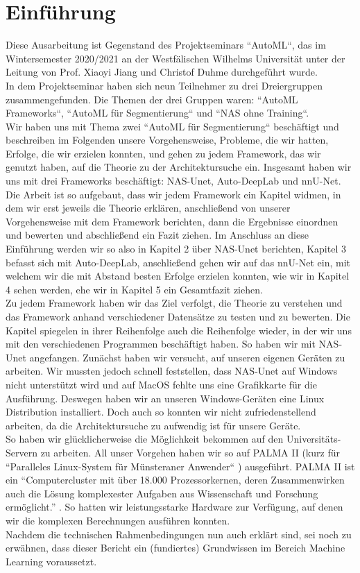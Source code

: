 \chapter{Einführung}
\label{ch:intro}

Diese Ausarbeitung ist Gegenstand des Projektseminars ``AutoML``, das im Wintersemester 2020/2021 an der Westfälischen Wilhelms Universität unter der Leitung von Prof. Xiaoyi Jiang und Christof Duhme durchgeführt wurde.\\
In dem Projektseminar haben sich neun Teilnehmer zu drei Dreiergruppen zusammengefunden. Die Themen der drei Gruppen waren: ``AutoML Frameworks``, ``AutoML für Segmentierung`` und ``NAS ohne Training``.\\
Wir haben uns mit Thema zwei ``AutoML für Segmentierung`` beschäftigt und beschreiben im Folgenden unsere Vorgehensweise, Probleme, die wir hatten, Erfolge, die wir erzielen konnten, und gehen zu jedem Framework, das wir genutzt haben, auf die Theorie zu der Architektursuche ein. Insgesamt haben wir uns mit drei Frameworks beschäftigt: NAS-Unet, Auto-DeepLab und nnU-Net. Die Arbeit ist so aufgebaut, dass wir jedem Framework ein Kapitel widmen, in dem wir erst jeweils die Theorie erklären, anschließend von unserer Vorgehensweise mit dem Framework berichten, dann die Ergebnisse einordnen und bewerten und abschließend ein Fazit ziehen. Im Anschluss an diese Einführung werden wir so also in Kapitel 2 über NAS-Unet berichten, Kapitel 3 befasst sich mit Auto-DeepLab, anschließend gehen wir auf das nnU-Net ein, mit welchem wir die mit Abstand besten Erfolge erzielen konnten, wie wir in Kapitel 4 sehen werden, ehe wir in Kapitel 5 ein Gesamtfazit ziehen.\\
Zu jedem Framework haben wir das Ziel verfolgt, die Theorie zu verstehen und das Framework anhand verschiedener Datensätze zu testen und zu bewerten. Die Kapitel spiegelen in ihrer Reihenfolge auch die Reihenfolge wieder, in der wir uns mit den verschiedenen Programmen beschäftigt haben. So haben wir mit NAS-Unet angefangen. Zunächst haben wir versucht, auf unseren eigenen Geräten zu arbeiten. Wir mussten jedoch schnell feststellen, dass NAS-Unet auf Windows nicht unterstützt wird und auf MacOS fehlte uns eine Grafikkarte für die Ausführung. Deswegen haben wir an unseren Windows-Geräten eine Linux Distribution installiert. Doch auch so konnten wir nicht zufriedenstellend arbeiten, da die Architektursuche zu aufwendig ist für unsere Geräte.\\ So haben wir glücklicherweise die Möglichkeit bekommen auf den Universitäts-Servern zu arbeiten. All unser Vorgehen haben wir so auf PALMA II (kurz für ``Paralleles Linux-System für Münsteraner Anwender`` \cite{palmaII}) ausgeführt. PALMA II ist ein \enquote{Computercluster mit über 18.000 Prozessorkernen, deren Zusammenwirken auch die Lösung komplexester Aufgaben aus Wissenschaft und Forschung ermöglicht.} \cite{palmaII}. So hatten wir leistungsstarke Hardware zur Verfügung, auf denen wir die komplexen Berechnungen ausführen konnten.\\
Nachdem die technischen Rahmenbedingungen nun auch erklärt sind, sei noch zu erwähnen, dass dieser Bericht ein (fundiertes) Grundwissen im Bereich Machine Learning voraussetzt.

